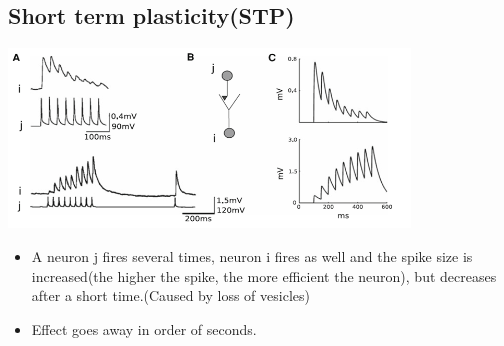 \documentclass[english,11pt]{article}
\begin{document}
\subsection{Short term plasticity(STP)}
\includegraphics[width=0.8\textwidth]{STP.png}
\begin{itemize}
\item A neuron j fires several times, neuron i fires as well and the spike size is increased(the higher the spike, the more efficient the neuron), but decreases after a short time.(Caused by loss of vesicles)
\item Effect goes away in order of seconds.
\end{itemize}
\end{document}
